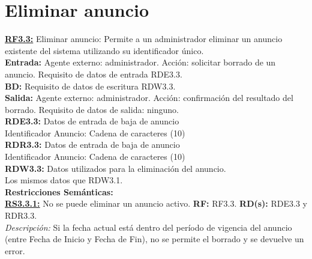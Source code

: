 \section{Eliminar anuncio}
\textbf{\textcolor{rojo}{\underline{RF3.3:}}} Eliminar anuncio: Permite a un administrador eliminar un anuncio existente del sistema utilizando su identificador único. \\[6pt]

\textbf{\textcolor{rojo}{Entrada:}} Agente externo: administrador. Acción: solicitar borrado de un anuncio. 
Requisito de datos de entrada \textcolor{azul}{RDE3.3}. \\[6pt]

\textbf{\textcolor{rojo}{BD:}} Requisito de datos de escritura \textcolor{azul}{RDW3.3}. \\[6pt]

\textbf{\textcolor{rojo}{Salida:}} Agente externo: administrador. Acción: confirmación del resultado del borrado. 
Requisito de datos de salida: ninguno. \\[12pt]

\textcolor{azul}{\textbf{RDE3.3:}} Datos de entrada de baja de anuncio \\
\hspace*{1cm} Identificador Anuncio: Cadena de caracteres (10) \\[12pt]

\textcolor{azul}{\textbf{RDR3.3:}} Datos de entrada de baja de anuncio \\
\hspace*{1cm} Identificador Anuncio: Cadena de caracteres (10) \\[12pt]


\textcolor{azul}{\textbf{RDW3.3:}} Datos utilizados para la eliminación del anuncio. \\
\hspace*{1cm} Los mismos datos que RDW3.1. \\[12pt] 

\textbf{\textcolor{verde}{Restricciones Semánticas:}} \\[6pt]
\textbf{\textcolor{verde}{\underline{RS3.3.1:}}} No se puede eliminar un anuncio activo. \textbf{RF:} RF3.3. \textbf{RD(s):} RDE3.3 y RDR3.3. \\
\hspace*{1cm} \textit{Descripción:} Si la fecha actual está dentro del período de vigencia del anuncio (entre Fecha de Inicio y Fecha de Fin), no se permite el borrado y se devuelve un error.


